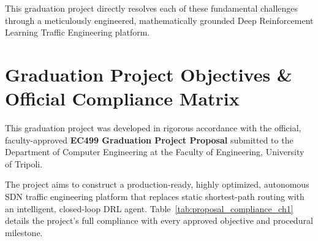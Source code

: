 \documentclass[12pt,a4paper,oneside]{report}
\begin{document}
This graduation project directly resolves each of these fundamental challenges through a meticulously engineered, mathematically grounded Deep Reinforcement Learning Traffic Engineering platform.

\section{Graduation Project Objectives \& Official Compliance Matrix}
This graduation project was developed in rigorous accordance with the official, faculty-approved \textbf{EC499 Graduation Project Proposal} submitted to the Department of Computer Engineering at the Faculty of Engineering, University of Tripoli. 

The project aims to construct a production-ready, highly optimized, autonomous SDN traffic engineering platform that replaces static shortest-path routing with an intelligent, closed-loop DRL agent. Table~\ref{tab:proposal_compliance_ch1} details the project's full compliance with every approved objective and procedural milestone.
\end{document}
